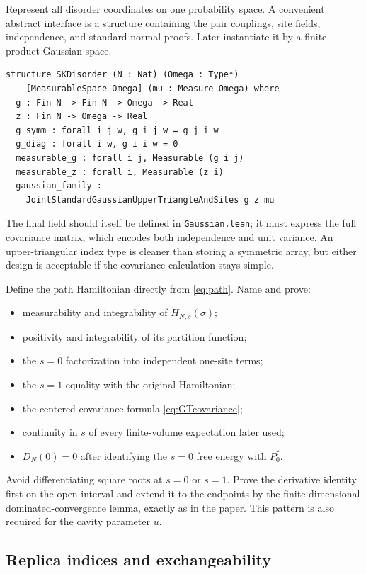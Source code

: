 \documentclass[11pt]{article}
\numberwithin{equation}{section}
\newcommand{\1}{\mathbf 1}
\begin{document}
Represent all disorder coordinates on one probability space.  A convenient
abstract interface is a structure containing the pair couplings, site
fields, independence, and standard-normal proofs.  Later instantiate it by a
finite product Gaussian space.
\begin{lstlisting}
structure SKDisorder (N : Nat) (Omega : Type*)
    [MeasurableSpace Omega] (mu : Measure Omega) where
  g : Fin N -> Fin N -> Omega -> Real
  z : Fin N -> Omega -> Real
  g_symm : forall i j w, g i j w = g j i w
  g_diag : forall i w, g i i w = 0
  measurable_g : forall i j, Measurable (g i j)
  measurable_z : forall i, Measurable (z i)
  gaussian_family :
    JointStandardGaussianUpperTriangleAndSites g z mu
\end{lstlisting}
The final field should itself be defined in \texttt{Gaussian.lean}; it must
express the full covariance matrix, which encodes both independence and unit
variance.  An upper-triangular index type is cleaner than storing a symmetric
array, but either design is acceptable if the covariance calculation stays
simple.

Define the path Hamiltonian directly from \eqref{eq:path}.  Name and prove:
\begin{itemize}[leftmargin=2em]
\item measurability and integrability of $H_{N,s}(\sigma)$;
\item positivity and integrability of its partition function;
\item the $s=0$ factorization into independent one-site terms;
\item the $s=1$ equality with the original Hamiltonian;
\item the centered covariance formula \eqref{eq:GTcovariance};
\item continuity in $s$ of every finite-volume expectation later used;
\item $D_N(0)=0$ after identifying the $s=0$ free energy with $P_0^*$.
\end{itemize}

Avoid differentiating square roots at $s=0$ or $s=1$.  Prove the derivative
identity first on the open interval and extend it to the endpoints by the
finite-dimensional dominated-convergence lemma, exactly as in the paper.
This pattern is also required for the cavity parameter $u$.

\subsection{Replica indices and exchangeability}
\end{document}
